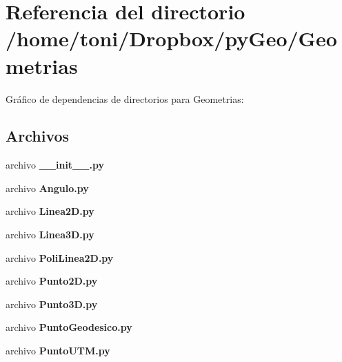 \section{Referencia del directorio /home/toni/\-Dropbox/py\-Geo/\-Geometrias}
\label{dir_1606a39a26db0051b7be64ac159196a0}
Gráfico de dependencias de directorios para Geometrias\-:
\subsection*{Archivos}
\begin{DoxyCompactItemize}
\item 
archivo {\bf \-\_\-\-\_\-init\-\_\-\-\_\-.\-py}
\item 
archivo {\bf Angulo.\-py}
\item 
archivo {\bf Linea2\-D.\-py}
\item 
archivo {\bf Linea3\-D.\-py}
\item 
archivo {\bf Poli\-Linea2\-D.\-py}
\item 
archivo {\bf Punto2\-D.\-py}
\item 
archivo {\bf Punto3\-D.\-py}
\item 
archivo {\bf Punto\-Geodesico.\-py}
\item 
archivo {\bf Punto\-U\-T\-M.\-py}
\end{DoxyCompactItemize}
